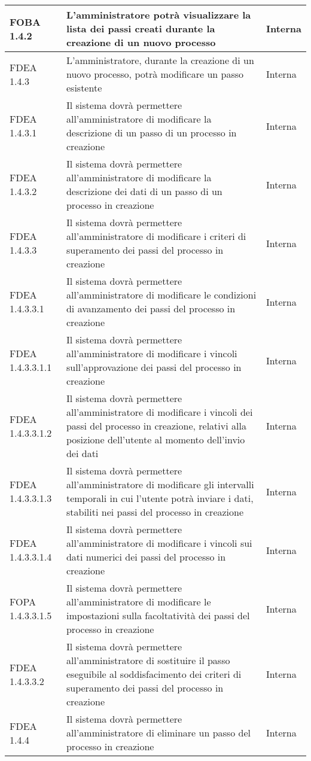 \begin{longtable}{lXp{}}
\midrule
FOBA 1.4.2&L'amministratore potrà visualizzare la lista dei passi creati durante la creazione di un nuovo processo&Interna\\
\midrule
FDEA 1.4.3&L'amministratore, durante la creazione di un nuovo processo, potrà modificare un passo esistente&Interna\\
\midrule
FDEA 1.4.3.1&Il sistema dovrà permettere all'amministratore di modificare la descrizione di un passo di un processo in creazione&Interna\\
\midrule
FDEA 1.4.3.2&Il sistema dovrà permettere all'amministratore di modificare la descrizione dei dati di un passo di un processo in creazione&Interna\\
\midrule
FDEA 1.4.3.3&Il sistema dovrà permettere all'amministratore di modificare i criteri di superamento dei passi del processo in creazione&Interna\\
\midrule
FDEA 1.4.3.3.1&Il sistema dovrà permettere all'amministratore di modificare le condizioni di avanzamento dei passi del processo in creazione&Interna\\
\midrule
FDEA 1.4.3.3.1.1&Il sistema dovrà permettere all'amministratore di modificare i vincoli sull'approvazione dei passi del processo in creazione&Interna\\
\midrule
FDEA 1.4.3.3.1.2&Il sistema dovrà permettere all'amministratore di modificare i vincoli dei passi del processo in creazione, relativi alla posizione dell'utente al momento dell'invio dei dati&Interna\\
\midrule
FDEA 1.4.3.3.1.3&Il sistema dovrà permettere all'amministratore di modificare gli intervalli temporali in cui l'utente potrà inviare i dati, stabiliti nei passi del processo in creazione&Interna\\
\midrule
FDEA 1.4.3.3.1.4&Il sistema dovrà permettere all'amministratore di modificare i vincoli sui dati numerici dei passi del processo in creazione&Interna\\
\midrule
FOPA 1.4.3.3.1.5&Il sistema dovrà permettere all'amministratore di modificare le impostazioni sulla facoltatività dei passi del processo in creazione&Interna\\
\midrule
FDEA 1.4.3.3.2&Il sistema dovrà permettere all'amministratore di sostituire il passo eseguibile al soddisfacimento dei criteri di superamento dei passi del processo in creazione&Interna\\
\midrule
FDEA 1.4.4&Il sistema dovrà permettere all'amministratore di eliminare un passo del processo in creazione&Interna\\

\end{longtable}
